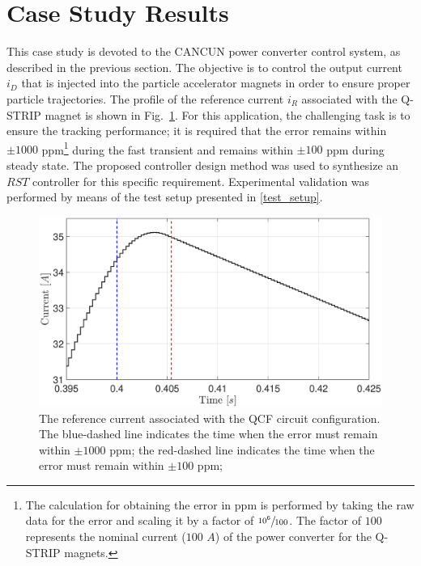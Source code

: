 \documentclass[journal]{IEEEtran}
\begin{document}
\section{Case Study Results}
\label{sec:5}
This case study is devoted to the CANCUN power converter control system, as described in the previous section. The objective is to control the output current $i_D$ that is injected into the particle accelerator magnets in order to ensure proper particle trajectories. The profile of the reference current $i_R$ associated with the Q-STRIP magnet is shown in Fig.~\ref{fig:QCF_ref}.  For this application, the challenging task is to ensure the tracking performance; it is required that the error remains within $\pm 1000$ ppm\footnote{The calculation for obtaining the error in ppm is performed by taking the raw data for the error and scaling it by a factor of $\sfrac{10^6}{100}$. The factor of $100$ represents the nominal current ($100$ $A$) of the power converter for the Q-STRIP magnets.} during the fast transient and remains within $\pm 100$ ppm during steady state. The proposed controller design method was used to synthesize an $RST$ controller for this specific requirement. Experimental validation was performed by means of the test setup presented in \ref{test_setup}. 
\begin{figure}
\centering
\includegraphics[width=\columnwidth]{pics_prbs/reference.eps}
\caption{The reference current associated with the QCF circuit configuration. The blue-dashed line indicates the time when the error must remain within $\pm 1000$ ppm; the red-dashed line indicates the time when the error must remain within $\pm 100$ ppm;}
\label{fig:QCF_ref}
\end{figure}
\end{document}
